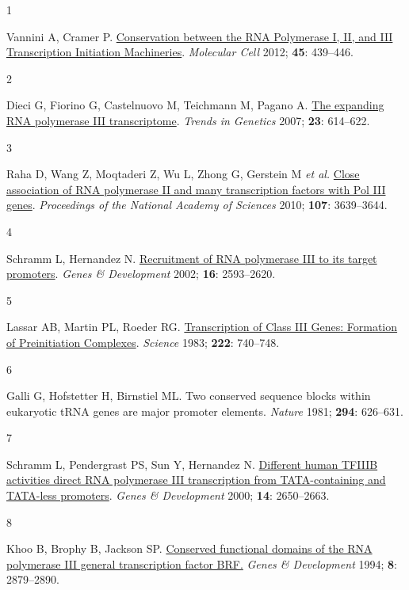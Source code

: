 \documentclass[
  11pt,
]{article}
\newlength{\cslhangindent}
\newlength{\csllabelwidth}
\newlength{\cslentryspacingunit} %
\newenvironment{CSLReferences}[2] %
 {%
  \setlength{\parindent}{0pt}
  \ifodd #1
  \let\oldpar\par
  \def\par{\hangindent=\cslhangindent\oldpar}
  \fi
  \setlength{\parskip}{#2\cslentryspacingunit}
 }%
 {}
\newcommand{\CSLLeftMargin}[1]{\parbox[t]{\csllabelwidth}{#1}}
\newcommand{\CSLRightInline}[1]{\parbox[t]{\linewidth - \csllabelwidth}{#1}\break}
\begin{document}
\hypertarget{refs}{}
\begin{CSLReferences}{0}{0}
\leavevmode{}%
\CSLLeftMargin{1 }%
\CSLRightInline{Vannini A, Cramer P. \href{https://doi.org/10.1016/j.molcel.2012.01.023}{Conservation between the RNA Polymerase I, II, and III Transcription Initiation Machineries}. \emph{Molecular Cell} 2012; \textbf{45}: 439--446.}

\leavevmode{}%
\CSLLeftMargin{2 }%
\CSLRightInline{Dieci G, Fiorino G, Castelnuovo M, Teichmann M, Pagano A. \href{https://doi.org/10.1016/j.tig.2007.09.001}{The expanding RNA polymerase III transcriptome}. \emph{Trends in Genetics} 2007; \textbf{23}: 614--622.}

\leavevmode{}%
\CSLLeftMargin{3 }%
\CSLRightInline{Raha D, Wang Z, Moqtaderi Z, Wu L, Zhong G, Gerstein M \emph{et al.} \href{https://doi.org/10.1073/pnas.0911315106}{Close association of RNA polymerase II and many transcription factors with Pol III genes}. \emph{Proceedings of the National Academy of Sciences} 2010; \textbf{107}: 3639--3644.}

\leavevmode{}%
\CSLLeftMargin{4 }%
\CSLRightInline{Schramm L, Hernandez N. \href{https://doi.org/10.1101/gad.1018902}{Recruitment of RNA polymerase III to its target promoters}. \emph{Genes \& Development} 2002; \textbf{16}: 2593--2620.}

\leavevmode{}%
\CSLLeftMargin{5 }%
\CSLRightInline{Lassar AB, Martin PL, Roeder RG. \href{https://doi.org/10.1126/science.6356356}{Transcription of Class III Genes: Formation of Preinitiation Complexes}. \emph{Science} 1983; \textbf{222}: 740--748.}

\leavevmode{}%
\CSLLeftMargin{6 }%
\CSLRightInline{Galli G, Hofstetter H, Birnstiel ML. Two conserved sequence blocks within eukaryotic {tRNA} genes are major promoter elements. \emph{Nature} 1981; \textbf{294}: 626--631.}

\leavevmode{}%
\CSLLeftMargin{7 }%
\CSLRightInline{Schramm L, Pendergrast PS, Sun Y, Hernandez N. \href{https://doi.org/10.1101/gad.836400}{Different human TFIIIB activities direct RNA polymerase III transcription from TATA-containing and TATA-less promoters}. \emph{Genes \& Development} 2000; \textbf{14}: 2650--2663.}

\leavevmode{}%
\CSLLeftMargin{8 }%
\CSLRightInline{Khoo B, Brophy B, Jackson SP. \href{https://doi.org/10.1101/gad.8.23.2879}{Conserved functional domains of the RNA polymerase III general transcription factor BRF.} \emph{Genes \& Development} 1994; \textbf{8}: 2879--2890.}


\end{CSLReferences}
\end{document}
